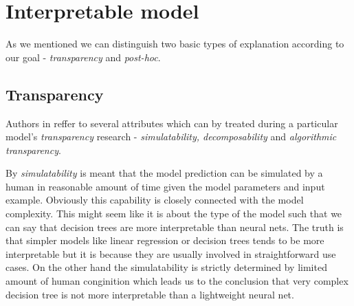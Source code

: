 



\section{Interpretable model}
As we mentioned we can distinguish two basic types of explanation according to our goal - \emph{transparency} and \emph{post-hoc}.

\subsection{Transparency}
Authors in \cite{Lipton2016} reffer to several attributes which can by treated during a particular model's \emph{transparency} research - \emph{simulatability, decomposability} and \emph{algorithmic transparency}.

By \emph{simulatability} is meant that the model prediction can be simulated by a human in reasonable amount of time given the model parameters and input example. Obviously this capability is closely connected with the model complexity. This might seem like it is about the type of the model such that we can say that decision trees are more interpretable than neural nets. The truth is that simpler models like linear regression or decision trees tends to be more interpretable but it is because they are usually involved in straightforward use cases. On the other hand the simulatability is strictly determined by limited amount of human conginition which leads us to the conclusion that very complex decision tree is not more interpretable than a lightweight neural net.

